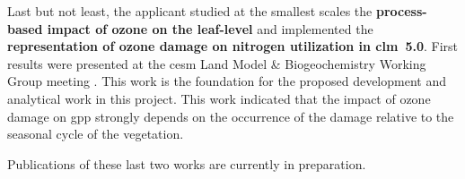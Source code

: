 Last but not least, the applicant studied at the smallest scales the \textbf{process-based impact of ozone on the leaf-level} and implemented the \textbf{representation of ozone damage on nitrogen utilization in \gls{clm}~5.0}. First results were presented at the \gls{cesm} Land Model \& Biogeochemistry Working Group meeting \parencite{CESMWP:Falk2021}. This work is the foundation for the proposed development and analytical work in this project. This work indicated that the impact of ozone damage on \gls{gpp} strongly depends on the occurrence of the damage relative to the seasonal cycle of the vegetation.

Publications of these last two works are currently in preparation.
